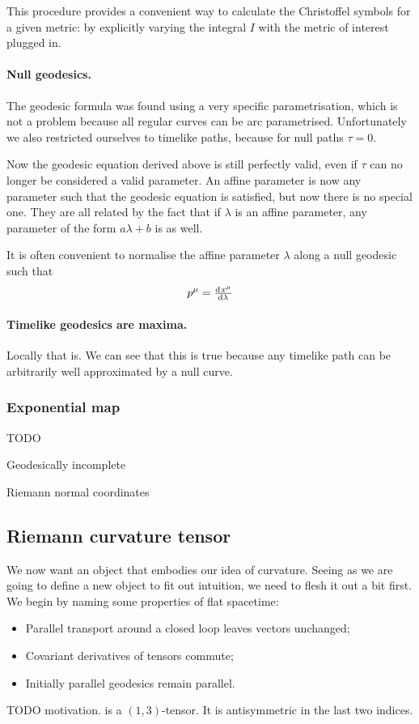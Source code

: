 This procedure provides a convenient way to calculate the Christoffel symbols for a given metric: by explicitly varying the integral $I$ with the metric of interest plugged in.

\paragraph{Null geodesics.} The geodesic formula was found using a very specific parametrisation, which is not a problem because all regular curves can be arc parametrised. Unfortunately we also restricted ourselves to timelike paths, because for null paths $\tau = 0$.

Now the geodesic equation derived above is still perfectly valid, even if $\tau$ can no longer be considered a valid parameter. An affine parameter is now any parameter such that the geodesic equation is satisfied, but now there is no special one. They are all related by the fact that if $\lambda$ is an affine parameter, any parameter of the form $a\lambda + b$ is as well. 

It is often convenient to normalise the affine parameter $\lambda$ along a null geodesic such that
\[ p^\mu = \od{x^\mu}{\lambda} \]

\paragraph{Timelike geodesics are maxima.} Locally that is. We can see that this is true because any timelike path can be arbitrarily well approximated by a null curve.

\subsubsection{Exponential map}
TODO

Geodesically incomplete

Riemann normal coordinates

\subsection{Riemann curvature tensor}
We now want an object that embodies our idea of curvature. Seeing as we are going to define a new object to fit out intuition, we need to flesh it out a bit first. We begin by naming some properties of flat spacetime:
\begin{itemize}
\item Parallel transport around a closed loop leaves vectors unchanged;
\item Covariant derivatives of tensors commute;
\item Initially parallel geodesics remain parallel.
\end{itemize}
TODO motivation.
 is a $(1,3)$-tensor. It is antisymmetric in the last two indices.

